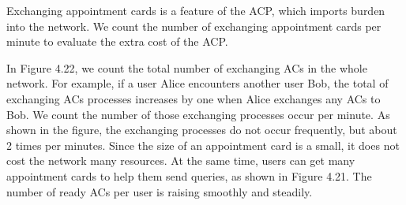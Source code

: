 \noindent Exchanging appointment cards is a feature of the ACP, which imports burden into the network. We count the number of exchanging appointment cards per minute to evaluate the extra cost of the ACP.

In Figure 4.22, we count the total number of exchanging ACs in the whole network. For example, if a user Alice encounters another user Bob, the total of exchanging ACs processes increases by one when Alice exchanges any ACs to Bob. We count the number of those exchanging processes occur per minute. As shown in the figure, the exchanging processes do not occur frequently, but about 2 times per minutes. Since the size of an appointment card is a small, it does not cost the network many resources. At the same time, users can get many appointment cards to help them send queries, as shown in Figure 4.21. The number of ready ACs per user is raising smoothly and steadily. 






